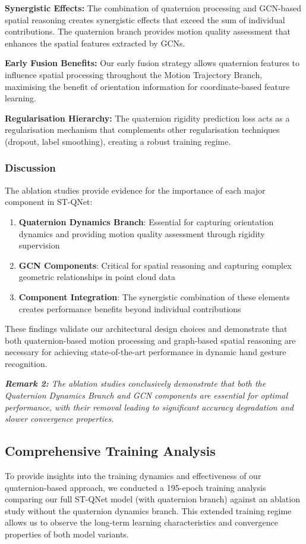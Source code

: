 \documentclass[journal]{IEEEtran}
\theoremstyle{plain}
\begin{document}
\textbf{Synergistic Effects:} The combination of quaternion processing and GCN-based spatial reasoning creates synergistic effects that exceed the sum of individual contributions. The quaternion branch provides motion quality assessment that enhances the spatial features extracted by GCNs.

\textbf{Early Fusion Benefits:} Our early fusion strategy allows quaternion features to influence spatial processing throughout the Motion Trajectory Branch, maximising the benefit of orientation information for coordinate-based feature learning.

\textbf{Regularisation Hierarchy:} The quaternion rigidity prediction loss acts as a regularisation mechanism that complements other regularisation techniques (dropout, label smoothing), creating a robust training regime.

\subsubsection{Discussion}
The ablation studies provide evidence for the importance of each major component in ST-QNet:

\begin{enumerate}
    \item \textbf{Quaternion Dynamics Branch}: Essential for capturing orientation dynamics and providing motion quality assessment through rigidity supervision
    \item \textbf{GCN Components}: Critical for spatial reasoning and capturing complex geometric relationships in point cloud data
    \item \textbf{Component Integration}: The synergistic combination of these elements creates performance benefits beyond individual contributions
\end{enumerate}

These findings validate our architectural design choices and demonstrate that both quaternion-based motion processing and graph-based spatial reasoning are necessary for achieving state-of-the-art performance in dynamic hand gesture recognition.

\textit{\textbf{Remark 2:} The ablation studies conclusively demonstrate that both the Quaternion Dynamics Branch and GCN components are essential for optimal performance, with their removal leading to significant accuracy degradation and slower convergence properties.}
\subsection{Comprehensive Training Analysis}\label{sec:training_analysis}
To provide insights into the training dynamics and effectiveness of our quaternion-based approach, we conducted a 195-epoch training analysis comparing our full ST-QNet model (with quaternion branch) against an ablation study without the quaternion dynamics branch. This extended training regime allows us to observe the long-term learning characteristics and convergence properties of both model variants.
\end{document}
